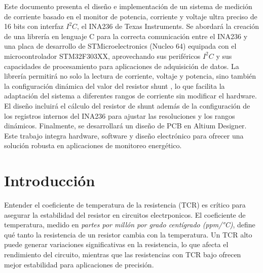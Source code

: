 \documentclass[
10pt, %
a4paper, %
oneside, %
headinclude,footinclude, %
BCOR5mm, %
]{scrartcl}
\begin{document}
Este documento presenta el diseño e implementación de un sistema de medición de corriente basado en el monitor de potencia, corriente y voltaje ultra preciso de 16 bits con interfaz $I^2C$, el INA236 de Texas Instruments. Se abordará la creación de una librería en lenguaje C para la correcta comunicación entre el INA236 y una placa de desarrollo de STMicroelectronics (Nucleo 64) equipada con el microcontrolador STM32F303XX, aprovechando sus periféricos $I^2C$ y sus capacidades de procesamiento para aplicaciones de adquisición de datos. La librería permitirá no solo la lectura de corriente, voltaje y potencia, sino también la configuración dinámica del valor del resistor shunt , lo que facilita la adaptación del sistema a diferentes rangos de corriente sin modificar el hardware. \\
El diseño incluirá el cálculo del resistor de shunt además de la configuración de los registros internos del INA236 para ajustar las resoluciones y los rangos dinámicos. Finalmente, se desarrollará un diseño de PCB en Altium Designer. Este trabajo integra hardware, software y diseño electrónico para ofrecer una solución robusta en aplicaciones de monitoreo energético.





\newpage %


\section{Introducción}
Entender el coeficiente de temperatura de la resistencia (TCR) es crítico para asegurar la estabilidad del resistor en circuitos electrponicos. El coeficiente de temperatura, medido en \textit{partes por millón por grado centígrado (ppm/°C)}, define qué tanto la resistencia de un resistor cambia con la temperatura. Un TCR alto puede generar variaciones significativas en la resistencia, lo que afecta el rendimiento del circuito, mientras que las resistencias con TCR bajo ofrecen mejor estabilidad para aplicaciones de precisión.
\end{document}
